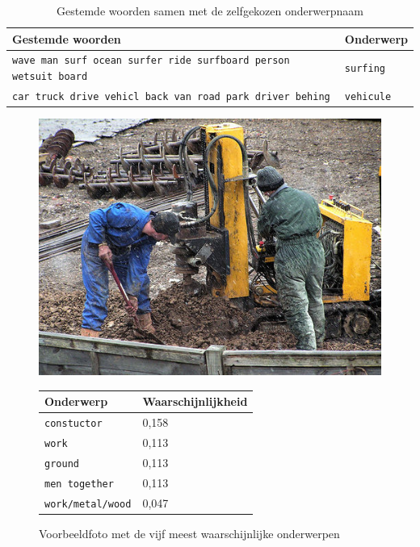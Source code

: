 \begin{table}
	
	\begin{tabular}{ll}
		Gestemde woorden                                               & Onderwerp \\ \hline
		\texttt{\small{wave man surf ocean surfer ride surfboard person wetsuit board}} & \texttt{surfing}       \\
		\texttt{\small{car truck drive vehicl back van road park driver behing}}        & \texttt{vehicule}      \\
	\end{tabular}
	\caption{Gestemde woorden samen met de zelfgekozen onderwerpnaam}	\label{tbl:woorden-naar-topic}
\end{table}


\begin{figure}[h]
	\centering
	\begin{minipage}[t]{.5\linewidth}
		\centering
		\vspace{0pt}
		\includegraphics[width=\textwidth]{Images/LDA/5402085.jpg}
	\end{minipage}\hfill
	\begin{minipage}[t]{.5\textwidth}
		\centering
		\vspace{0pt}
		\begin{tabular}{ll}
			Onderwerp                           & Waarschijnlijkheid\\
			\hline
			\texttt{constuctor}             & 0,158 \\
			\texttt{work}                   & 0,113 \\
			\texttt{ground}                 & 0,113 \\
			\texttt{men together}           & 0,113 \\
			\texttt{work/metal/wood}        & 0,047\\
			\hline
		\end{tabular}
	\end{minipage}
	\caption{Voorbeeldfoto met de vijf meest waarschijnlijke onderwerpen}
	\label{fig:ldatopics}
\end{figure}

